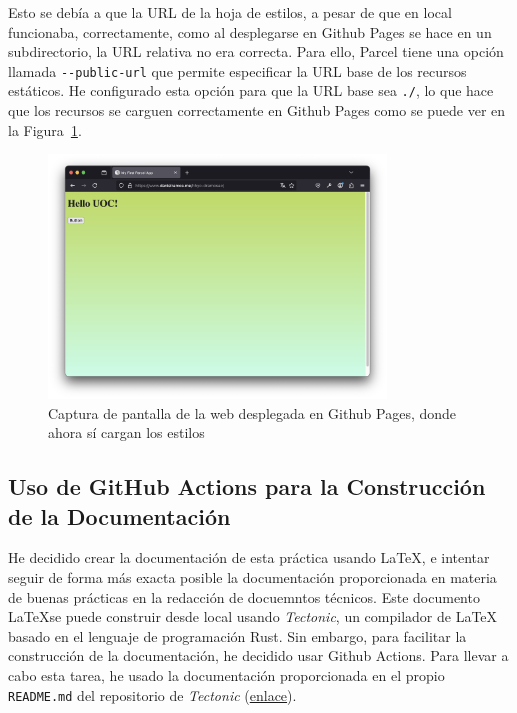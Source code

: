\documentclass{article}
\begin{document}
Esto se debía a que la URL de la hoja de estilos, a pesar de que en local funcionaba, correctamente, como al desplegarse en Github Pages se hace en un subdirectorio, la URL relativa no era correcta.
Para ello, Parcel tiene una opción llamada \lstinline|--public-url| que permite especificar la URL base de los recursos estáticos.
He configurado esta opción para que la URL base sea \lstinline|./|, lo que hace que los recursos se carguen correctamente en Github Pages como se puede ver en la Figura~\ref{fig:web-deployed}.

\begin{figure}[h!]
    \centering
    \includegraphics[width=0.8\textwidth]{./img/web-deployed}
    \caption{Captura de pantalla de la web desplegada en Github Pages, donde ahora sí cargan los estilos}
    \label{fig:web-deployed}
\end{figure}

\subsection{Uso de GitHub Actions para la Construcción de la Documentación}\label{subsec:uso-de-github-actions-para-la-construccion-de-la-documentacion}

He decidido crear la documentación de esta práctica usando \LaTeX, e intentar seguir de forma más exacta posible la documentación proporcionada en materia de buenas prácticas en la redacción de docuemntos técnicos.
Este documento \LaTeX se puede construir desde local usando \textit{Tectonic}, un compilador de LaTeX basado en el lenguaje de programación Rust.
Sin embargo, para facilitar la construcción de la documentación, he decidido usar Github Actions.
Para llevar a cabo esta tarea, he usado la documentación proporcionada en el propio \lstinline|README.md| del repositorio de \textit{Tectonic} (\href{https://github.com/marketplace/actions/setup-tectonic}{enlace}).
\end{document}
